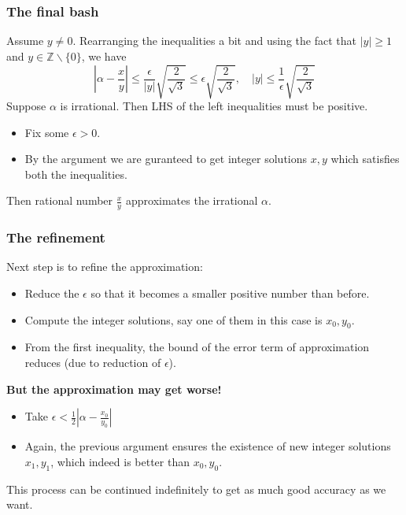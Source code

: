 \documentclass{beamer}
\begin{document}
    \begin{frame}
        \frametitle{The final bash}
        Assume \(y \neq 0\). Rearranging the inequalities a bit and using the fact that \(|y| \geq 1\) and \(y \in \mathbb{Z}\backslash\{0\}\), we have \[\left|\alpha - \frac{x}{y}\right| \leq \frac{\epsilon}{|y|}\sqrt{\frac{2}{\sqrt{3}}} \leq \epsilon\sqrt{\frac{2}{\sqrt{3}}}, \quad |y| \leq \frac{1}{\epsilon}\sqrt{\frac{2}{\sqrt{3}}}\] \pause Suppose \(\alpha\) is irrational. Then LHS of the left inequalities must be positive. \pause
        \begin{itemize}
            \item<1-> Fix some \(\epsilon > 0\).
            \item<2-> By the argument we are guranteed to get integer solutions \(x,y\) which satisfies both the inequalities.
        \end{itemize}
        Then rational number \(\frac{x}{y}\) approximates the irrational \(\alpha\).
    \end{frame}
    \begin{frame}
    \frametitle{The refinement}
        Next step is to refine the approximation: 
        \begin{itemize}
            \item<1-> Reduce the \(\epsilon\) so that it becomes a smaller positive number than before. \pause
            \item<2-> Compute the integer solutions, say one of them in this case is \(x_0, y_0\). \pause
            \item<3-> From the first inequality, the bound of the error term of approximation reduces (due to reduction of \(\epsilon\)). \pause
        \end{itemize}
        \textbf{But the approximation may get worse!} \pause
        \begin{itemize}
            \item Take \(\epsilon < \frac{1}{2}\left|\alpha - \frac{x_0}{y_0}\right|\) \pause
            \item Again, the previous argument ensures the existence of new integer solutions \(x_1, y_1\), which indeed is better than \(x_0, y_0\).
        \end{itemize}
        This process can be continued indefinitely to get as much good accuracy as we want.
        
    \end{frame}
\end{document}
